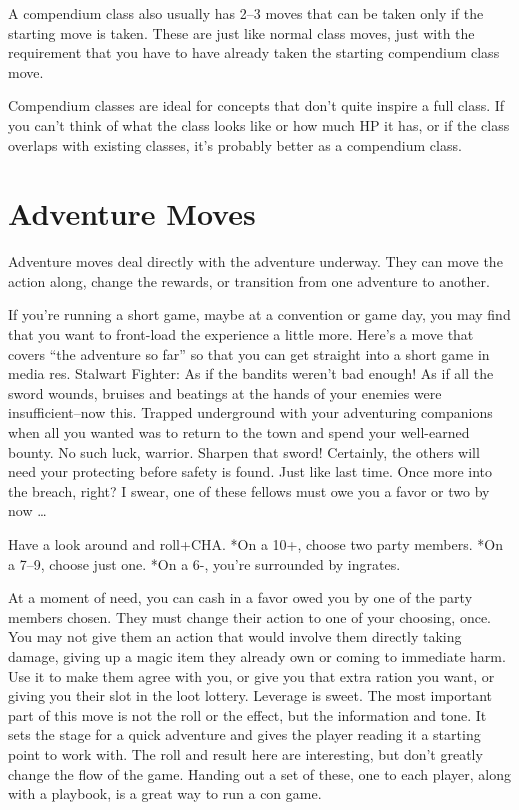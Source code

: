 A compendium class also usually has 2--3 moves that can be taken only if the starting move is taken. These are just like normal class moves, just with the requirement that you have to have already taken the starting compendium class move.


Compendium classes are ideal for concepts that don't quite inspire a full class. If you can't think of what the class looks like or how much HP it has, or if the class overlaps with existing classes, it's probably better as a compendium class.
\section*{Adventure Moves}


Adventure moves deal directly with the adventure underway. They can move the action along, change the rewards, or transition from one adventure to another.


If you're running a short game, maybe at a convention or game day, you may find that you want to front-load the experience a little more. Here's a move that covers ``the adventure so far'' so that you can get straight into a short game in media res.
\newpage
\HRule
Stalwart Fighter: As if the bandits weren't bad enough! As if all the sword wounds, bruises and beatings at the hands of your enemies were insufficient--now this. Trapped underground with your adventuring companions when all you wanted was to return to the town and spend your well-earned bounty. No such luck, warrior. Sharpen that sword! Certainly, the others will need your protecting before safety is found. Just like last time. Once more into the breach, right? I swear, one of these fellows must owe you a favor or two by now \ldots 


Have a look around and roll+CHA. *On a 10+, choose two party members. *On a 7--9, choose just one. *On a 6-, you're surrounded by ingrates.


At a moment of need, you can cash in a favor owed you by one of the party members chosen. They must change their action to one of your choosing, once. You may not give them an action that would involve them directly taking damage, giving up a magic item they already own or coming to immediate harm. Use it to make them agree with you, or give you that extra ration you want, or giving you their slot in the loot lottery. Leverage is sweet.
\HRule
The most important part of this move is not the roll or the effect, but the information and tone. It sets the stage for a quick adventure and gives the player reading it a starting point to work with. The roll and result here are interesting, but don't greatly change the flow of the game. Handing out a set of these, one to each player, along with a playbook, is a great way to run a con game.


